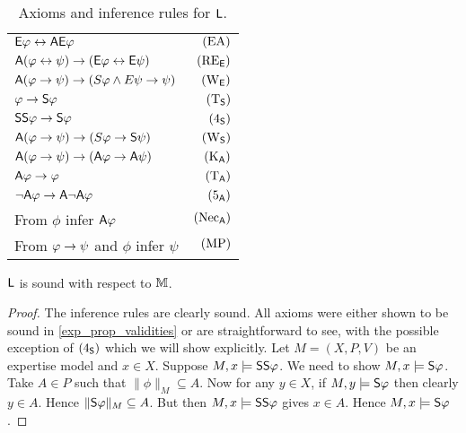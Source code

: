 \begin{table}
    \centering
    \caption{Axioms and inference rules for $\sL$.}
    \label{exp_tab_axioms_general_case}
    \begin{tabular}{lr}
        \toprule
         $\E\phi \liff \A\E\phi$
             & $\EA$ \\
         $\A(\phi \liff \psi) \limplies (\E\phi \liff \E\psi)$
             & $\reE$ \\
         $\A(\phi \limplies \psi) \limplies (S\phi \land E\psi \limplies \psi)$
             & $\weakeningE$ \\
         \midrule
         $\phi \limplies \S\phi$
             & $\Tsoundness$ \\
         $\S\S\phi \limplies \S\phi$
             & $\foursoundness$ \\
         $\A(\phi \limplies \psi) \limplies (S\phi \limplies \S\psi)$
             & $\weakeningS$ \\
         \midrule
         $\A(\phi \limplies \psi) \limplies (\A\phi \limplies \A\psi)$
             & $\Kuniv$ \\
         $\A\phi \limplies \phi$
             & $\Tuniv$ \\
         $\neg\A\phi \limplies \A\neg\A\phi$
             & $\fiveuniv$ \\
         \midrule
         From $\phi$ infer $\A\phi$
             & $\necuniv$ \\
         From $\phi \limplies \psi$ and $\phi$ infer $\psi$
             & $\modpon$ \\
        \bottomrule
    \end{tabular}
\end{table}

\begin{lemma}
\label{exp_lemma_soundness_m}
    $\sL$ is sound with respect to $\M$.
\end{lemma}

\begin{proof}
    The inference rules are clearly sound. All axioms were either shown to be
    sound in \cref{exp_prop_validities} or are straightforward to see, with the
    possible exception of $\foursoundness$ which we will show explicitly. Let
    $M = (X, P, V)$ be an expertise model and $x \in X$. Suppose $M, x \models
    \S\S\phi$. We need to show $M, x \models \S\phi$. Take $A \in P$ such that
    $\|\phi\|_M \subseteq A$. Now for any $y \in X$, if $M, y \models \S\phi$
    then clearly $y \in A$. Hence $\|\S\phi\|_M \subseteq A$. But then $M, x
    \models \S\S\phi$ gives $x \in A$. Hence $M, x \models \S\phi$.
\end{proof}

